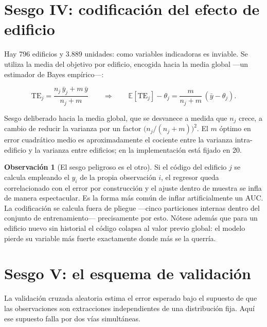 \documentclass[11pt,a4paper]{article}
\theoremstyle{definition}
\newtheorem{observacion}{Observación}
\newcommand{\E}{\mathbb{E}}
\begin{document}
\section{Sesgo IV: codificación del efecto de edificio}

Hay 796 edificios y 3.889 unidades: como variables indicadoras es inviable. Se
utiliza la media del objetivo por edificio, encogida hacia la media global ---un
estimador de Bayes empírico---:

\begin{equation}
\mathrm{TE}_j=\frac{n_j\,\bar{y}_j+m\,\bar{y}}{n_j+m}
\qquad\Longrightarrow\qquad
\E[\mathrm{TE}_j]-\theta_j=\frac{m}{n_j+m}\,(\bar{y}-\theta_j).
\label{eq:te}
\end{equation}

Sesgo deliberado hacia la media global, que se desvanece a medida que $n_j$
crece, a cambio de reducir la varianza por un factor $\bigl(n_j/(n_j+m)\bigr)^2$.
El $m$ óptimo en error cuadrático medio es aproximadamente el cociente entre la
varianza intra-edificio y la varianza entre edificios; en la implementación está
fijado en 20.

\begin{observacion}[El sesgo peligroso es el otro]
Si el código del edificio $j$ se calcula empleando el $y_i$ de la propia
observación $i$, el regresor queda correlacionado con el error por construcción y
el ajuste dentro de muestra se infla de manera espectacular. Es la forma más
común de inflar artificialmente un AUC. La codificación se calcula fuera de
pliegue ---cinco particiones internas dentro del conjunto de entrenamiento---
precisamente por esto. Nótese además que para un edificio nuevo sin historial el
código colapsa al valor previo global: el modelo pierde su variable más fuerte
exactamente donde más se la querría.
\end{observacion}

\section{Sesgo V: el esquema de validación}

La validación cruzada aleatoria estima el error esperado bajo el supuesto de que
las observaciones son extracciones independientes de una distribución fija. Aquí
ese supuesto falla por dos vías simultáneas.
\end{document}
